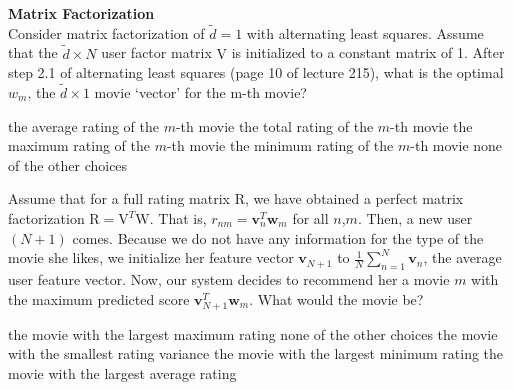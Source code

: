 \documentclass[a4paper,10pt]{exam}
\begin{document}
\begin{questions}
	   \question \textbf{Matrix Factorization}\\
	   Consider matrix factorization of $\tilde{d} = 1$ with alternating least squares. Assume that the $\tilde{d} \times N$ user factor matrix $\mathrm{V}$ is initialized to a constant matrix of 1. After step 2.1 of alternating least squares (page 10 of lecture 215), what is the optimal $w_m$, the $\tilde{d} \times 1$ movie `vector' for the m-th movie?
	   \begin{choices}
	   	\CorrectChoice the average rating of the $m$-th movie
	   	\choice the total rating of the $m$-th movie
	   	\choice the maximum rating of the $m$-th movie
	   	\choice the minimum rating of the $m$-th movie
	   	\choice none of the other choices\\
	   \end{choices}
	   
	   \question Assume that for a full rating matrix $\mathrm{R}$, we have obtained a perfect matrix factorization $\mathrm{R} = \mathrm{V}^T \mathrm{W}$. That is, $r_{nm} = \mathbf{v}_n^T \mathbf{w}_m$ for all $n$,$m$. Then, a new user $(N+1)$ comes. Because we do not have any information for the type of the movie she likes, we initialize her feature vector $\mathbf{v}_{N+1}$ to $\frac{1}{N} \sum_{n    =1}^N \mathbf{v}_n$, the average user feature vector. Now, our system decides to recommend her a movie $m$ with the maximum predicted score $\mathbf{v}_{N+1}^T \mathbf{w}_m$. What would the movie be?
	   \begin{choices}
	   	\choice the movie with the largest maximum rating
	   	\choice none of the other choices
	   	\choice the movie with the smallest rating variance
	   	\choice the movie with the largest minimum rating
	   	\CorrectChoice the movie with the largest average rating\\
	   \end{choices}
	   

\end{questions}
\end{document}
